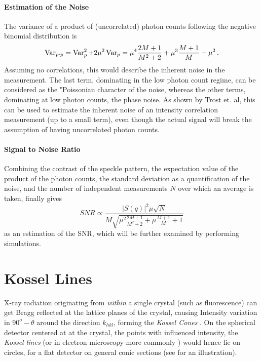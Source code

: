 \paragraph{Estimation of the Noise}
The variance of a product of (uncorrelated) photon counts following the negative binomial distribution  is
\begin{equation}
	\operatorname{Var}_{p\cdot p}= \operatorname{Var}_p^2 +2 \mu^2\operatorname{Var}_p	= \mu^4 \frac{2 M + 1}{M^2 + 2}+ \mu^3 \frac{M+1}{M} + \mu^2 \,.
\end{equation}
Assuming no correlations, this would describe the inherent noise in the measurement. The last term, dominating in the low photon count regime, can be considered as the "Poissonian character of the noise, whereas the other terms, dominating at low photon counts, the phase noise.
As shown by Trost et. al, this can be used to estimate the inherent noise of an intensity correlation measurement (up to a small term), even though the actual signal will break the assumption of having uncorrelated photon counts\cite{trost2020}.

\paragraph{Signal to Noise Ratio}
Combining the contrast of the speckle pattern, the expectation value of the product of the photon counts, the standard deviation as a quantification of the noise, and the number of independent measurements $N$ over which an average is taken, finally gives 
\begin{equation}
SNR\propto  \frac{|S(q)|^2 \mu\sqrt{N}}{M\sqrt{\mu^2 \frac{2 M + 1}{M^2 + 2}+ \mu \frac{M+1}{M} + 1}}
\end{equation}
as an estimation of the SNR, which will be further examined by performing simulations.





\section{Kossel Lines}
\label{sec:kossel}
X-ray radiation  originating from \textit{within} a single crystal (such as fluorescence) can get Bragg reflected at the lattice planes of the crystal, causing Intensity variation in $90^o-\theta$ around the direction $k_{hkl}$, forming the \textit{Kossel Cones} \cite{cowley1995}. On the spherical detector centered at at the crystal, the points with influenced intensity, the \textit{Kossel lines} (or in electron microscopy more commonly ) would hence lie on circles, for a flat detector on general conic sections (see  for an illustration).

